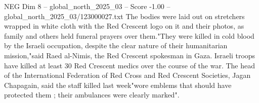 \begin{textsample}{NEG Dim 8 – global\_north\_2025\_03 – Score -1.00 – global\_north\_2025\_03/123000027.txt}
The bodies were laid out on stretchers wrapped in white cloth with the Red Crescent logo on it and their photos, as family and others held funeral prayers over them."They were killed in cold blood by the Israeli occupation, despite the clear nature of their humanitarian mission,"said Raed al-Nimis, the Red Crescent spokesman in Gaza.
Israeli troops have killed at least 30 Red Crescent medics over the course of the war.
The head of the International Federation of Red Cross and Red Crescent Societies, Jagan Chapagain, said the staff killed last week"wore emblems that should have protected them ; their ambulances were clearly marked".

\end{textsample}
